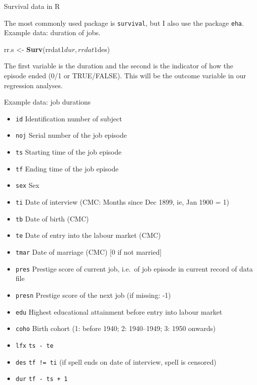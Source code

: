 \documentclass[10pt,ignorenonframetext,]{beamer}
\newenvironment{Shaded}{\begin{snugshade}}{\end{snugshade}}
\newcommand{\KeywordTok}[1]{\textcolor[rgb]{0.13,0.29,0.53}{\textbf{{#1}}}}
\newcommand{\StringTok}[1]{\textcolor[rgb]{0.31,0.60,0.02}{{#1}}}
\newcommand{\NormalTok}[1]{{#1}}
\providecommand{\tightlist}{%
\setlength{\itemsep}{0pt}\setlength{\parskip}{0pt}}
\begin{document}
\begin{frame}[fragile]{Survival data in R}

The most commonly used package is \texttt{survival}, but I also use the
package \texttt{eha}. Example data: duration of jobs.

\begin{Shaded}
\begin{Highlighting}[]
\NormalTok{rr.s <-}\StringTok{ }\KeywordTok{Surv}\NormalTok{(rrdat1$dur, rrdat1$des)}
\end{Highlighting}
\end{Shaded}

The first variable is the duration and the second is the indicator of
how the episode ended (0/1 or TRUE/FALSE). This will be the outcome
variable in our regression analyses.

\end{frame}

\begin{frame}[fragile]{Example data: job durations}

\begin{itemize}
\tightlist
\item
  \texttt{id} Identification number of subject
\item
  \texttt{noj} Serial number of the job episode
\item
  \texttt{ts} Starting time of the job episode
\item
  \texttt{tf} Ending time of the job episode
\item
  \texttt{sex} Sex
\item
  \texttt{ti} Date of interview (CMC: Months since Dec 1899, ie, Jan
  1900 = 1)
\item
  \texttt{tb} Date of birth (CMC)
\item
  \texttt{te} Date of entry into the labour market (CMC)
\item
  \texttt{tmar} Date of marriage (CMC) {[}0 if not married{]}
\item
  \texttt{pres} Prestige score of current job, i.e.~of job episode in
  current record of data file
\item
  \texttt{presn} Prestige score of the next job (if missing: -1)
\item
  \texttt{edu} Highest educational attainment before entry into labour
  market
\item
  \texttt{coho} Birth cohort (1: before 1940; 2: 1940--1949; 3: 1950
  onwards)
\item
  \texttt{lfx} \texttt{ts\ -\ te}
\item
  \texttt{des} \texttt{tf\ !=\ ti} (if spell ends on date of interview,
  spell is censored)
\item
  \texttt{dur} \texttt{tf\ -\ ts\ +\ 1}
\end{itemize}

\end{frame}
\end{document}
